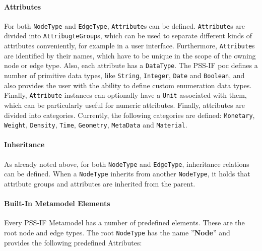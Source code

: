 \paragraph{Attributes}

For both \texttt{NodeType} and \texttt{EdgeType}, \texttt{Attribute}s can be defined. \texttt{At\-tribute}s are divided into \texttt{AttribugteGroup}s, which can be used to separate different kinds of attributes conveniently, for example in a user interface. Furthermore, \texttt{Attribute}s are identified by their names, which have to be unique in the scope of the owning node or edge type. Also, each attribute has a \texttt{DataType}. The PSS-IF \gls{poc} defines a number of primitive data types, like \texttt{String}, \texttt{Integer}, \texttt{Date} and \texttt{Boolean}, and also provides the user with the ability to define custom enumeration data types. Finally, \texttt{Attribute} instances can optionally have a \texttt{Unit} associated with them, which can be particularly useful for numeric attributes. Finally, attributes are divided into categories. Currently, the following categories are defined: \texttt{Monetary}, \texttt{Weight}, \texttt{Density}, \texttt{Time}, \texttt{Geometry}, \texttt{MetaData} and \texttt{Material}.

\paragraph{Inheritance}

As already noted above, for both \texttt{NodeType} and \texttt{EdgeType}, inheritance relations can be defined. When a \texttt{NodeType} inherits from another \texttt{NodeType}, it holds that attribute groups and attributes are inherited from the parent.

\paragraph{Built-In Metamodel Elements}

Every PSS-IF Metamodel has a number of predefined elements. These are the root node and edge types. The root \texttt{NodeType} has the name ''\textbf{Node}'' and provides the following predefined Attributes:

